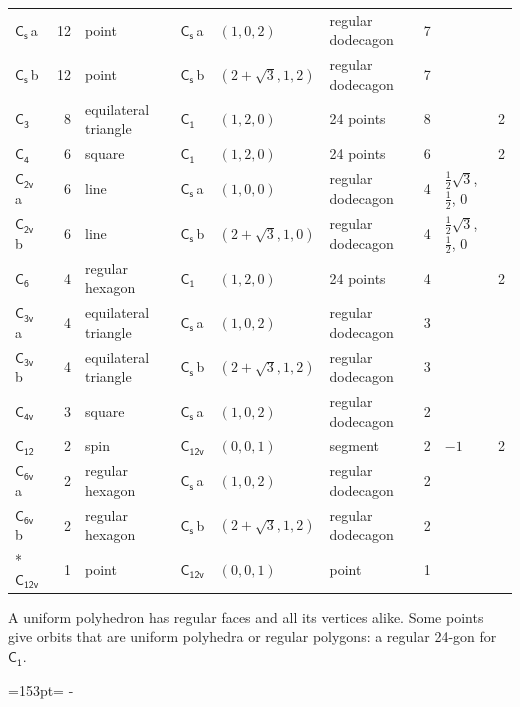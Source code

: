 \documentclass[10pt,a4paper]{article}
\newcommand{\needspace}[1]{\par\penalty-100\begingroup\dimen0=#1\relax\dimen2=\pagegoal
  \advance\dimen2-\pagetotal\ifdim\dimen0>\dimen2\relax\ifdim\dimen2>0pt\vfil\break\fi\fi
  \endgroup}
\numberwithin{equation}{section}
\newcommand{\grp}[1]{\mathsf{#1}}
\newcommand{\clsletter}[1]{\,{\scriptsize\color{black!55}#1}}
\newlength{\fillwidth}\newlength{\cellwidth}\newlength{\colwidth}
\begin{document}
{{\begin{longtable}{@{}lrllllr>{\RaggedRight\arraybackslash}p{\fillwidth}r@{}}
\href{C1v.pdf}{$\grp{C_{s}}$}\clsletter{a} & 12 & point & \href{C1v.pdf}{$\grp{C_{s}}$}\clsletter{a} & $(1, 0, 2)$ & regular dodecagon & 7 &  & \\
\href{C1v.pdf}{$\grp{C_{s}}$}\clsletter{b} & 12 & point & \href{C1v.pdf}{$\grp{C_{s}}$}\clsletter{b} & $(2 + \sqrt{3}, 1, 2)$ & regular dodecagon & 7 &  & \\
\href{C3.pdf}{$\grp{C_{3}}$} & 8 & equilateral triangle & \href{C1.pdf}{$\grp{C_{1}}$} & $(1, 2, 0)$ & 24 points & 8 &  & 2\\
\href{C4.pdf}{$\grp{C_{4}}$} & 6 & square & \href{C1.pdf}{$\grp{C_{1}}$} & $(1, 2, 0)$ & 24 points & 6 &  & 2\\
\href{C2v.pdf}{$\grp{C_{2v}}$}\clsletter{a} & 6 & line & \href{C1v.pdf}{$\grp{C_{s}}$}\clsletter{a} & $(1, 0, 0)$ & regular dodecagon & 4 & ${\tfrac{1}{2}\sqrt{3}}$, ${\tfrac{1}{2}}$, ${0}$ & \\
\href{C2v.pdf}{$\grp{C_{2v}}$}\clsletter{b} & 6 & line & \href{C1v.pdf}{$\grp{C_{s}}$}\clsletter{b} & $(2 + \sqrt{3}, 1, 0)$ & regular dodecagon & 4 & ${\tfrac{1}{2}\sqrt{3}}$, ${\tfrac{1}{2}}$, ${0}$ & \\
\href{C6.pdf}{$\grp{C_{6}}$} & 4 & regular hexagon & \href{C1.pdf}{$\grp{C_{1}}$} & $(1, 2, 0)$ & 24 points & 4 &  & 2\\
\href{C3v.pdf}{$\grp{C_{3v}}$}\clsletter{a} & 4 & equilateral triangle & \href{C1v.pdf}{$\grp{C_{s}}$}\clsletter{a} & $(1, 0, 2)$ & regular dodecagon & 3 &  & \\
\href{C3v.pdf}{$\grp{C_{3v}}$}\clsletter{b} & 4 & equilateral triangle & \href{C1v.pdf}{$\grp{C_{s}}$}\clsletter{b} & $(2 + \sqrt{3}, 1, 2)$ & regular dodecagon & 3 &  & \\
\href{C4v.pdf}{$\grp{C_{4v}}$} & 3 & square & \href{C1v.pdf}{$\grp{C_{s}}$}\clsletter{a} & $(1, 0, 2)$ & regular dodecagon & 2 &  & \\
\href{C12.pdf}{$\grp{C_{12}}$} & 2 & spin & \href{C12v.pdf}{$\grp{C_{12v}}$} & $(0, 0, 1)$ & segment & 2 & ${-1}$ & 2\\
\href{C6v.pdf}{$\grp{C_{6v}}$}\clsletter{a} & 2 & regular hexagon & \href{C1v.pdf}{$\grp{C_{s}}$}\clsletter{a} & $(1, 0, 2)$ & regular dodecagon & 2 &  & \\
\href{C6v.pdf}{$\grp{C_{6v}}$}\clsletter{b} & 2 & regular hexagon & \href{C1v.pdf}{$\grp{C_{s}}$}\clsletter{b} & $(2 + \sqrt{3}, 1, 2)$ & regular dodecagon & 2 &  & \\*
\href{C12v.pdf}{$\grp{C_{12v}}$} & 1 & point & \href{C12v.pdf}{$\grp{C_{12v}}$} & $(0, 0, 1)$ & point & 1 &  & \\
\bottomrule\end{longtable}}}
A uniform polyhedron has regular faces and all its vertices alike. Some points give orbits that are uniform polyhedra or regular polygons: a regular 24-gon for \href{C1.pdf}{$\grp{C_{1}}$}.
\needspace{153pt}
\end{document}
